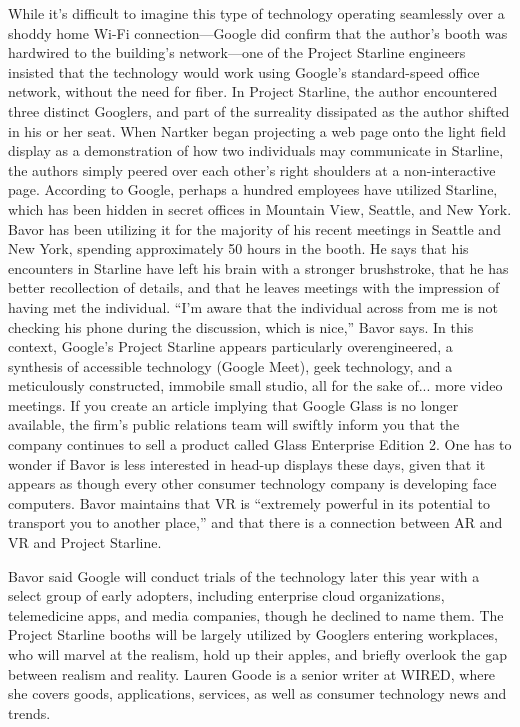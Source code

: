 While it's difficult to imagine this type of technology operating seamlessly over a shoddy home Wi-Fi connection—Google did confirm that the author's booth was hardwired to the building's network—one of the Project Starline engineers insisted that the technology would work using Google's standard-speed office network, without the need for fiber.
In Project Starline, the author encountered three distinct Googlers, and part of the surreality dissipated as the author shifted in his or her seat.
When Nartker began projecting a web page onto the light field display as a demonstration of how two individuals may communicate in Starline, the authors simply peered over each other's right shoulders at a non-interactive page.
According to Google, perhaps a hundred employees have utilized Starline, which has been hidden in secret offices in Mountain View, Seattle, and New York.
Bavor has been utilizing it for the majority of his recent meetings in Seattle and New York, spending approximately 50 hours in the booth.
He says that his encounters in Starline have left his brain with a stronger brushstroke, that he has better recollection of details, and that he leaves meetings with the impression of having met the individual.
“I'm aware that the individual across from me is not checking his phone during the discussion, which is nice,” Bavor says.
In this context, Google's Project Starline appears particularly overengineered, a synthesis of accessible technology (Google Meet), geek technology, and a meticulously constructed, immobile small studio, all for the sake of... more video meetings.
If you create an article implying that Google Glass is no longer available, the firm's public relations team will swiftly inform you that the company continues to sell a product called Glass Enterprise Edition 2.
One has to wonder if Bavor is less interested in head-up displays these days, given that it appears as though every other consumer technology company is developing face computers.
Bavor maintains that VR is “extremely powerful in its potential to transport you to another place,” and that there is a connection between AR and VR and Project Starline.

Bavor said Google will conduct trials of the technology later this year with a select group of early adopters, including enterprise cloud organizations, telemedicine apps, and media companies, though he declined to name them.
The Project Starline booths will be largely utilized by Googlers entering workplaces, who will marvel at the realism, hold up their apples, and briefly overlook the gap between realism and reality.
Lauren Goode is a senior writer at WIRED, where she covers goods, applications, services, as well as consumer technology news and trends.

